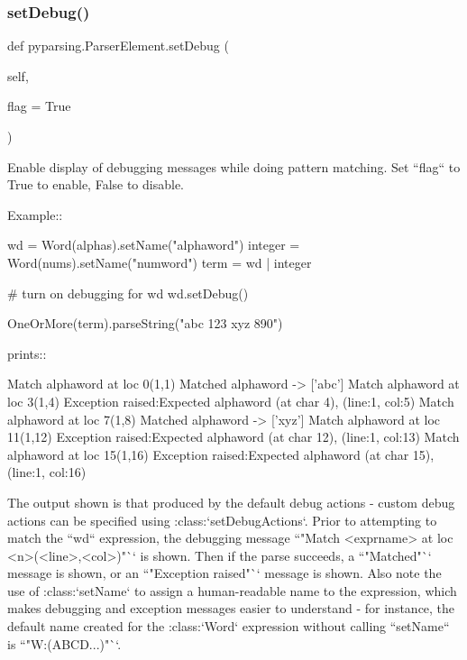 \subsubsection{\texorpdfstring{set\+Debug()}{setDebug()}}
{\footnotesize\ttfamily def pyparsing.\+Parser\+Element.\+set\+Debug (\begin{DoxyParamCaption}\item[{}]{self,  }\item[{}]{flag = {\ttfamily True} }\end{DoxyParamCaption})}

\begin{DoxyVerb}Enable display of debugging messages while doing pattern matching.
Set ``flag`` to True to enable, False to disable.

Example::

    wd = Word(alphas).setName("alphaword")
    integer = Word(nums).setName("numword")
    term = wd | integer

    # turn on debugging for wd
    wd.setDebug()

    OneOrMore(term).parseString("abc 123 xyz 890")

prints::

    Match alphaword at loc 0(1,1)
    Matched alphaword -> ['abc']
    Match alphaword at loc 3(1,4)
    Exception raised:Expected alphaword (at char 4), (line:1, col:5)
    Match alphaword at loc 7(1,8)
    Matched alphaword -> ['xyz']
    Match alphaword at loc 11(1,12)
    Exception raised:Expected alphaword (at char 12), (line:1, col:13)
    Match alphaword at loc 15(1,16)
    Exception raised:Expected alphaword (at char 15), (line:1, col:16)

The output shown is that produced by the default debug actions - custom debug actions can be
specified using :class:`setDebugActions`. Prior to attempting
to match the ``wd`` expression, the debugging message ``"Match <exprname> at loc <n>(<line>,<col>)"``
is shown. Then if the parse succeeds, a ``"Matched"`` message is shown, or an ``"Exception raised"``
message is shown. Also note the use of :class:`setName` to assign a human-readable name to the expression,
which makes debugging and exception messages easier to understand - for instance, the default
name created for the :class:`Word` expression without calling ``setName`` is ``"W:(ABCD...)"``.
\end{DoxyVerb}
 \mbox{\label{classpyparsing_1_1ParserElement_a75debf95f36a4f456b6760a315587c50}} 
